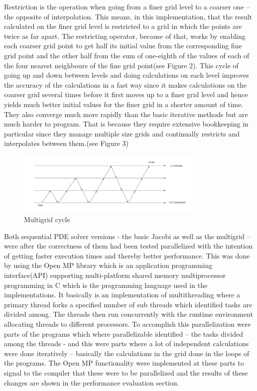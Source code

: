 \documentclass{article}
\begin{document}
Restriction is the operation when going from a finer grid level to a coarser one – the opposite of interpolation. This means, in this implementation, that the result calculated on the finer grid level is restricted to a grid in which the points are twice as far apart. The restricting operator, because of that, works by enabling each coarser grid point to get half its initial value from the corresponding fine grid point and the other half from the sum of one-eighth of the values of each of the four nearest neighbours of the fine grid point(see Figure 2). This cycle of going up and down between levels and doing calculations on each level improves the accuracy of the calculations in a fast way since it makes calculations on the coarser grid several times before it first moves up to a finer grid level and hence yields much better initial values for the finer grid in a shorter amount of time. They also converge much more rapidly than the basic iterative methods but are much harder to program. That is because they require extensive bookkeeping in particular since they manage multiple size grids and continually restricts and interpolates between them.(see Figure 3)

\begin{figure}[h!]
    \centering
    \includegraphics[width=0.8\textwidth]{../images/multigridpattern.png}
    \caption{Multigrid cycle}
    \label{fig:basic}
\end{figure}
 \newpage
 
Both sequential PDE solver versions - the basic Jacobi as well as the multigrid – were after the correctness of them had been tested parallelized with the intention of getting faster execution times and thereby better performance. This was done by using the Open MP library which is an application programming interface(API) supporting multi-platform shared memory multiprocessor programming in C which is the programming language used in the implementations. It basically is an implementation of multithreading where a primary thread forks a specified number of sub threads which identified tasks are divided among. The threads then run concurrently with the runtime environment allocating threads to different processors. To accomplish this parallelization were parts of the programs which where parallelizable identified – the tasks divided among the threads - and this were parts where a lot of independent calculations were done iteratively – basically the calculations in the grid done in the loops of the programs. The Open MP functionality were implemented at these parts to signal to the compiler that these were to be parallelized and the results of these changes are shown in the performance evaluation section.
\end{document}
